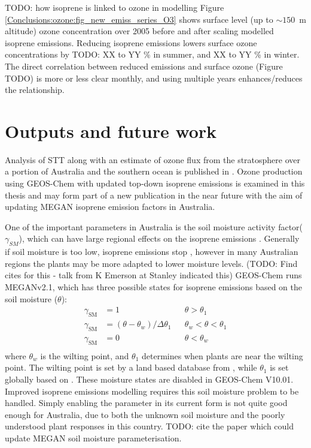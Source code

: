   
  TODO: how isoprene is linked to ozone in modelling 
  Figure \ref{Conclusions:ozone:fig_new_emiss_series_O3} shows surface level (up to $\sim 150$~m altitude) ozone concentration over 2005 before and after scaling modelled isoprene emissions.
  Reducing isoprene emissions lowers surface ozone concentrations by TODO: XX to YY \% in summer, and XX to YY \% in winter.
  The direct correlation between reduced emissions and surface ozone (Figure TODO) is more or less clear monthly, and using multiple years enhances/reduces the relationship.
  

  
\section{Outputs and future work}
\label{Conclusions:future}
  
  Analysis of STT along with an estimate of ozone flux from the stratosphere over a portion of Australia and the southern ocean is published in \textcite{Greenslade2017}.
  Ozone production using GEOS-Chem with updated top-down isoprene emissions is examined in this thesis and may form part of a new publication in the near future with the aim of updating MEGAN isoprene emission factors in Australia.
  
  One of the important parameters in Australia is the soil moisture activity factor($\gamma_{SM}$), which can have large regional effects on the isoprene emissions \parencite{Sindelarova2014,Bauwens2016}.
  Generally if soil moisture is too low, isoprene emissions stop \parencite{Pegoraro2004,Niinemets2010}, however in many Australian regions the plants may be more adapted to lower moisture levels. (TODO: Find cites for this - talk from K Emerson at Stanley indicated this)
  GEOS-Chem runs MEGANv2.1, which has three possible states for isoprene emissions based on the soil moisture ($\theta$):
  \begin{align*}
  \gamma_\mathrm{SM} & = 1 && \theta > \theta_1 \\
  \gamma_\mathrm{SM} & = (\theta-\theta_w)/\Delta\theta_1  && \theta_w < \theta < \theta_1 \\
  \gamma_\mathrm{SM} & = 0 && \theta < \theta_w \\
  \end{align*}
  where $\theta_w$ is the wilting point, and $\theta_1$ determines when plants are near the wilting point.
  The wilting point is set by a land based database from \textcite{Chen2001}, while $\theta_1$ is set globally based on \textcite{Pegoraro2004}.
  These moisture states are disabled in GEOS-Chem V10.01.
  Improved isoprene emissions modelling requires this soil moisture problem to be handled.
  Simply enabling the parameter in its current form is not quite good enough for Australia, due to both the unknown soil moisture and the poorly understood plant responses in this country.
  TODO: cite the paper which could update MEGAN soil moisture parameterisation.
  
